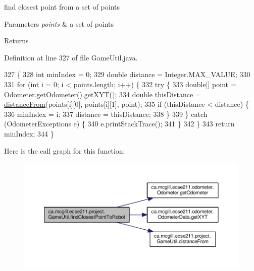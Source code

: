 find closest point from a set of points


\begin{DoxyParams}{Parameters}
{\em points} & a set of points \\
\hline
\end{DoxyParams}
\begin{DoxyReturn}{Returns}

\end{DoxyReturn}


Definition at line 327 of file Game\+Util.\+java.


\begin{DoxyCode}
327                                                             \{
328     \textcolor{keywordtype}{int} minIndex = 0;
329     \textcolor{keywordtype}{double} distance = Integer.MAX\_VALUE;
330 
331     \textcolor{keywordflow}{for} (\textcolor{keywordtype}{int} i = 0; i < points.length; i++) \{
332       \textcolor{keywordflow}{try} \{
333         \textcolor{keywordtype}{double}[] point = Odometer.getOdometer().getXYT();
334         \textcolor{keywordtype}{double} thisDistance = \hyperlink{classca_1_1mcgill_1_1ecse211_1_1project_1_1_game_util_a6fb324a3d5e42414c83dfd8bd5910b56}{distanceFrom}(points[i][0], points[i][1], point);
335         \textcolor{keywordflow}{if} (thisDistance < distance) \{
336           minIndex = i;
337           distance = thisDistance;
338         \}
339       \} \textcolor{keywordflow}{catch} (OdometerExceptions e) \{
340         e.printStackTrace();
341       \}
342     \}
343     \textcolor{keywordflow}{return} minIndex;
344   \}
\end{DoxyCode}
Here is the call graph for this function\+:\nopagebreak
\begin{figure}[H]
\begin{center}
\leavevmode
\includegraphics[width=350pt]{classca_1_1mcgill_1_1ecse211_1_1project_1_1_game_util_a6e0ee94b800ca3727ca8009782abda14_cgraph}
\end{center}
\end{figure}
